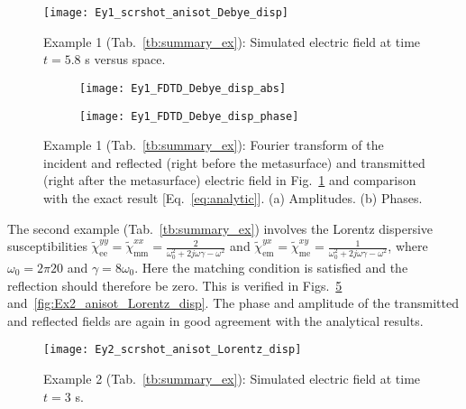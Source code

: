 \documentclass[journal]{IEEEtran}
\begin{document}
\begin{figure}[!ht]
\centering
\texttt{[image: Ey1\_scrshot\_anisot\_Debye\_disp]}
\caption{Example 1 (Tab.~\ref{tb:summary_ex}): Simulated electric field at time $t=5.8$ s versus space.}\label{fig:Ex1_anisot_Debye_disp_1}
\end{figure}

\begin{figure}[!ht]
\centering
\begin{subfigure}{1\columnwidth}
  \centering
  \texttt{[image: Ey1\_FDTD\_Debye\_disp\_abs]}
 \caption{}\label{fig:Ex1_anisot_Debye_disp_2}
\end{subfigure}

\begin{subfigure}{1\columnwidth}
  \centering
  \texttt{[image: Ey1\_FDTD\_Debye\_disp\_phase]}
 \caption{}\label{fig:Ex1_anisot_Debye_disp_3}
\end{subfigure}
\caption{Example 1 (Tab.~\ref{tb:summary_ex}): Fourier transform of the incident and reflected (right before the metasurface) and transmitted (right after the metasurface) electric field in Fig.~\ref{fig:Ex1_anisot_Debye_disp_1} and comparison with the exact result [Eq.~\eqref{eq:analytic}]. (a) Amplitudes. (b) Phases.}
\label{fig:Ex1_anisot_Debye_disp}
\end{figure}

The second example (Tab.~\ref{tb:summary_ex}) involves the Lorentz dispersive susceptibilities $\tilde{\chi}_\textrm{ee}^{yy}=\tilde{\chi}_\textrm{mm}^{xx}=\frac{2}{\omega_0^2+2j\omega\gamma-\omega^2}$ and $\tilde{\chi}_\textrm{em}^{yx}=\tilde{\chi}_\textrm{me}^{xy}=\frac{1}{\omega_0^2+2j\omega\gamma-\omega^2}$, where $\omega_0=2\pi20$ and $\gamma=8\omega_0$. Here the matching condition is satisfied and the reflection should therefore be zero. This is verified in Figs.~\ref{fig:Ex2_anisot_Lorentz_disp_1} and~\ref{fig:Ex2_anisot_Lorentz_disp}. The phase and amplitude of the transmitted and reflected fields are again in good agreement with the analytical results.
\begin{figure}
\centering
\texttt{[image: Ey2\_scrshot\_anisot\_Lorentz\_disp]}
\caption{Example 2 (Tab.~\ref{tb:summary_ex}): Simulated electric field at time $t=3$ s.}\label{fig:Ex2_anisot_Lorentz_disp_1}
\end{figure}
\end{document}

